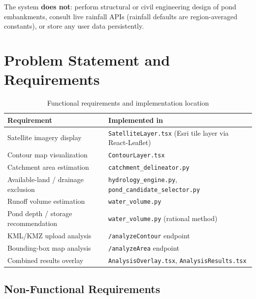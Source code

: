\documentclass[manuscript,screen,review]{acmart}
\begin{document}
The system \textbf{does not}: perform structural or civil engineering
design of pond embankments, consult live rainfall APIs (rainfall
defaults are region-averaged constants), or store any user data
persistently.

\section{Problem Statement and Requirements}
\label{sec:requirements}

\begin{table}[h]
  \caption{Functional requirements and implementation location}
  \label{tab:requirements}
  \begin{tabular}{p{3.8cm}p{3.4cm}}
    \toprule
    Requirement & Implemented in \\
    \midrule
    Satellite imagery display & \texttt{SatelliteLayer.tsx} (Esri tile layer via React-Leaflet) \\
    Contour map visualization & \texttt{ContourLayer.tsx} \\
    Catchment area estimation & \texttt{catchment\_delineator.py} \\
    Available-land / drainage exclusion & \texttt{hydrology\_engine.py}, \texttt{pond\_candidate\_selector.py} \\
    Runoff volume estimation & \texttt{water\_volume.py} \\
    Pond depth / storage recommendation & \texttt{water\_volume.py} (rational method) \\
    KML/KMZ upload analysis & \texttt{/analyzeContour} endpoint \\
    Bounding-box map analysis & \texttt{/analyzeArea} endpoint \\
    Combined results overlay & \texttt{AnalysisOverlay.tsx}, \texttt{AnalysisResults.tsx} \\
    \bottomrule
  \end{tabular}
\end{table}

\subsection{Non-Functional Requirements}
\end{document}
